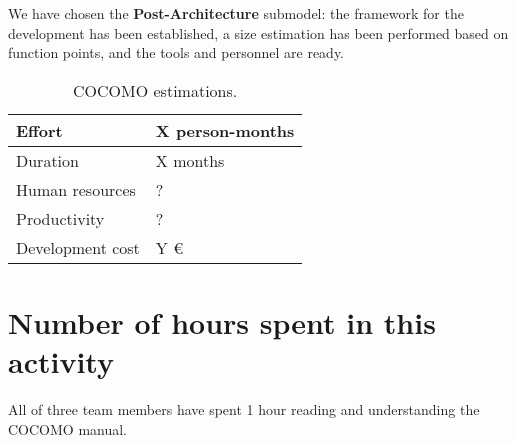 \documentclass{article}
\newcommand{\seprule}{{\color{gray} \noindent \hspace{40pt} \hrulefill \hspace{40pt} \vspace{13pt}}}
\begin{document}
\seprule

We have chosen the \textbf{Post-Architecture} submodel: the framework for the development has been established, a size estimation has been performed based on function points, and the tools and personnel are ready.


\begin{table}[hbtp]
\centering
\begin{tabular}{l|l}
Effort & X person-months \\ \hline
Duration & X months \\ \hline
Human resources & ? \\ \hline
Productivity & ? \\ \hline
Development cost & Y \euro
\end{tabular}
\caption{COCOMO estimations.}
\label{tblProblem1}
\end{table}

\appendix

\section{Number of hours spent in this activity}

All of three team members have spent 1 hour reading and understanding the COCOMO manual.
\end{document}

